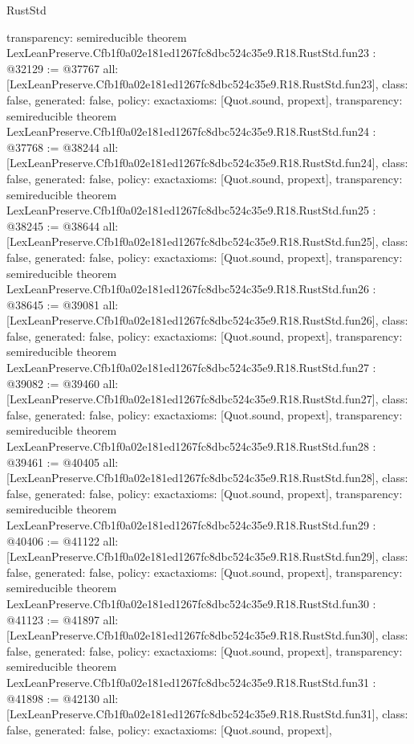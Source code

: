 \begin{lexlean}{RustStd}
\begin{coremodule}
{  transparency: semireducible
}
theorem LexLeanPreserve.Cfb1f0a02e181ed1267fc8dbc524c35e9.R18.RustStd.fun23 : @32129 := @37767 {
  all: [LexLeanPreserve.Cfb1f0a02e181ed1267fc8dbc524c35e9.R18.RustStd.fun23],
  class: false,
  generated: false,
  policy: exact{axioms: [Quot.sound, propext]},
  transparency: semireducible
}
theorem LexLeanPreserve.Cfb1f0a02e181ed1267fc8dbc524c35e9.R18.RustStd.fun24 : @37768 := @38244 {
  all: [LexLeanPreserve.Cfb1f0a02e181ed1267fc8dbc524c35e9.R18.RustStd.fun24],
  class: false,
  generated: false,
  policy: exact{axioms: [Quot.sound, propext]},
  transparency: semireducible
}
theorem LexLeanPreserve.Cfb1f0a02e181ed1267fc8dbc524c35e9.R18.RustStd.fun25 : @38245 := @38644 {
  all: [LexLeanPreserve.Cfb1f0a02e181ed1267fc8dbc524c35e9.R18.RustStd.fun25],
  class: false,
  generated: false,
  policy: exact{axioms: [Quot.sound, propext]},
  transparency: semireducible
}
theorem LexLeanPreserve.Cfb1f0a02e181ed1267fc8dbc524c35e9.R18.RustStd.fun26 : @38645 := @39081 {
  all: [LexLeanPreserve.Cfb1f0a02e181ed1267fc8dbc524c35e9.R18.RustStd.fun26],
  class: false,
  generated: false,
  policy: exact{axioms: [Quot.sound, propext]},
  transparency: semireducible
}
theorem LexLeanPreserve.Cfb1f0a02e181ed1267fc8dbc524c35e9.R18.RustStd.fun27 : @39082 := @39460 {
  all: [LexLeanPreserve.Cfb1f0a02e181ed1267fc8dbc524c35e9.R18.RustStd.fun27],
  class: false,
  generated: false,
  policy: exact{axioms: [Quot.sound, propext]},
  transparency: semireducible
}
theorem LexLeanPreserve.Cfb1f0a02e181ed1267fc8dbc524c35e9.R18.RustStd.fun28 : @39461 := @40405 {
  all: [LexLeanPreserve.Cfb1f0a02e181ed1267fc8dbc524c35e9.R18.RustStd.fun28],
  class: false,
  generated: false,
  policy: exact{axioms: [Quot.sound, propext]},
  transparency: semireducible
}
theorem LexLeanPreserve.Cfb1f0a02e181ed1267fc8dbc524c35e9.R18.RustStd.fun29 : @40406 := @41122 {
  all: [LexLeanPreserve.Cfb1f0a02e181ed1267fc8dbc524c35e9.R18.RustStd.fun29],
  class: false,
  generated: false,
  policy: exact{axioms: [Quot.sound, propext]},
  transparency: semireducible
}
theorem LexLeanPreserve.Cfb1f0a02e181ed1267fc8dbc524c35e9.R18.RustStd.fun30 : @41123 := @41897 {
  all: [LexLeanPreserve.Cfb1f0a02e181ed1267fc8dbc524c35e9.R18.RustStd.fun30],
  class: false,
  generated: false,
  policy: exact{axioms: [Quot.sound, propext]},
  transparency: semireducible
}
theorem LexLeanPreserve.Cfb1f0a02e181ed1267fc8dbc524c35e9.R18.RustStd.fun31 : @41898 := @42130 {
  all: [LexLeanPreserve.Cfb1f0a02e181ed1267fc8dbc524c35e9.R18.RustStd.fun31],
  class: false,
  generated: false,
  policy: exact{axioms: [Quot.sound, propext]},
}
\end{coremodule}
\end{lexlean}
